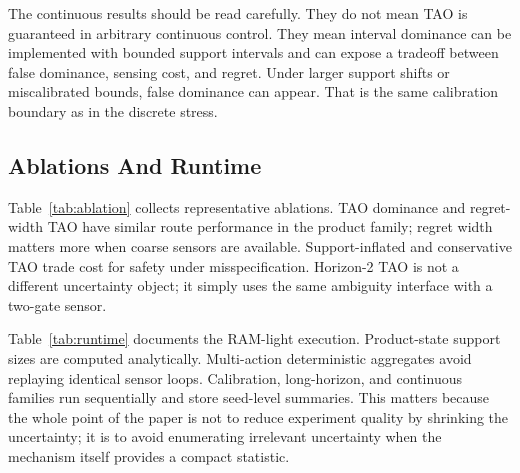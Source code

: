\documentclass{article}
\begin{document}
\begin{table}[t]
  \centering
  \caption{Continuous/noisy loss probe at width 0.40 and shift scale 0.03.}
  \label{tab:continuous}
  \resizebox{\linewidth}{!}{}
\end{table}

The continuous results should be read carefully. They do not mean TAO is guaranteed in arbitrary continuous control. They mean interval dominance can be implemented with bounded support intervals and can expose a tradeoff between false dominance, sensing cost, and regret. Under larger support shifts or miscalibrated bounds, false dominance can appear. That is the same calibration boundary as in the discrete stress.

\subsection{Ablations And Runtime}

Table~\ref{tab:ablation} collects representative ablations. TAO dominance and regret-width TAO have similar route performance in the product family; regret width matters more when coarse sensors are available. Support-inflated and conservative TAO trade cost for safety under misspecification. Horizon-2 TAO is not a different uncertainty object; it simply uses the same ambiguity interface with a two-gate sensor.

\begin{table}[t]
  \centering
  \caption{Representative ablations across experiment families.}
  \label{tab:ablation}
  \resizebox{\linewidth}{!}{}
\end{table}

\begin{table}[t]
  \centering
  \caption{Experiment scale and RAM-light implementation. Episode counts are logical simulated episodes or exact aggregate equivalents; artifacts store seed summaries rather than full state enumerations.}
  \label{tab:runtime}
  \resizebox{\linewidth}{!}{}
\end{table}

Table~\ref{tab:runtime} documents the RAM-light execution. Product-state support sizes are computed analytically. Multi-action deterministic aggregates avoid replaying identical sensor loops. Calibration, long-horizon, and continuous families run sequentially and store seed-level summaries. This matters because the whole point of the paper is not to reduce experiment quality by shrinking the uncertainty; it is to avoid enumerating irrelevant uncertainty when the mechanism itself provides a compact statistic.
\end{document}
